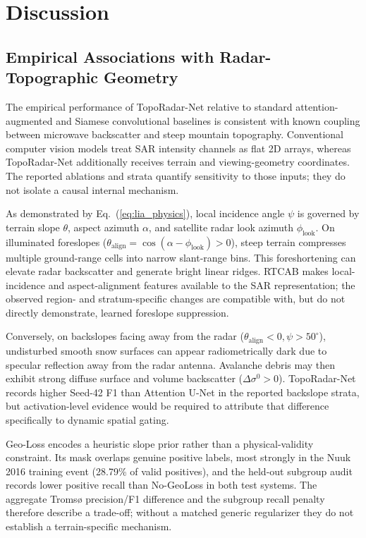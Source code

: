 \section{Discussion}
\label{sec:discussion}

\subsection{Empirical Associations with Radar-Topographic Geometry}
\label{sec:disc:physics}

The empirical performance of TopoRadar-Net relative to standard attention-augmented and Siamese convolutional baselines is consistent with known coupling between microwave backscatter and steep mountain topography. Conventional computer vision models treat SAR intensity channels as flat 2D arrays, whereas TopoRadar-Net additionally receives terrain and viewing-geometry coordinates. The reported ablations and strata quantify sensitivity to those inputs; they do not isolate a causal internal mechanism.

As demonstrated by Eq.~(\ref{eq:lia_physics}), local incidence angle $\psi$ is governed by terrain slope $\theta$, aspect azimuth $\alpha$, and satellite radar look azimuth $\phi_{\text{look}}$. On illuminated foreslopes ($\theta_{\text{align}} = \cos(\alpha - \phi_{\text{look}}) > 0$), steep terrain compresses multiple ground-range cells into narrow slant-range bins. This foreshortening can elevate radar backscatter and generate bright linear ridges. RTCAB makes local-incidence and aspect-alignment features available to the SAR representation; the observed region- and stratum-specific changes are compatible with, but do not directly demonstrate, learned foreslope suppression.

Conversely, on backslopes facing away from the radar ($\theta_{\text{align}} < 0, \psi > 50^\circ$), undisturbed smooth snow surfaces can appear radiometrically dark due to specular reflection away from the radar antenna. Avalanche debris may then exhibit strong diffuse surface and volume backscatter ($\Delta \sigma^0 > 0$). TopoRadar-Net records higher Seed-42 F1 than Attention U-Net in the reported backslope strata, but activation-level evidence would be required to attribute that difference specifically to dynamic spatial gating.

Geo-Loss encodes a heuristic slope prior rather than a physical-validity constraint. Its mask overlaps genuine positive labels, most strongly in the Nuuk 2016 training event (28.79\% of valid positives), and the held-out subgroup audit records lower positive recall than No-GeoLoss in both test systems. The aggregate Troms{\o} precision/F1 difference and the subgroup recall penalty therefore describe a trade-off; without a matched generic regularizer they do not establish a terrain-specific mechanism.

